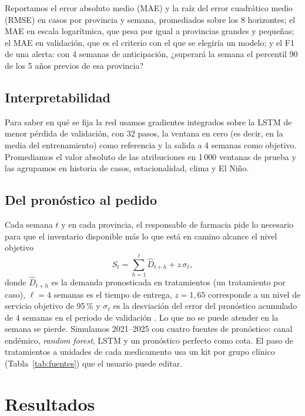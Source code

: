 \documentclass[conference,a4paper]{IEEEtran}
\begin{document}
Reportamos el error absoluto medio (MAE) y la raíz del error cuadrático medio (RMSE) en casos por provincia y semana, promediados sobre los 8 horizontes; el MAE en escala logarítmica, que pesa por igual a provincias grandes y pequeñas; el MAE en validación, que es el criterio con el que se elegiría un modelo; y el F1 de una alerta: con 4 semanas de anticipación, ¿superará la semana el percentil 90 de los 5 años previos de esa provincia?

\subsection{Interpretabilidad}
Para saber en qué se fija la red usamos gradientes integrados \cite{sundararajan2017ig} sobre la LSTM de menor pérdida de validación, con 32 pasos, la ventana en cero (es decir, en la media del entrenamiento) como referencia y la salida a 4 semanas como objetivo. Promediamos el valor absoluto de las atribuciones en 1\,000 ventanas de prueba y las agrupamos en historia de casos, estacionalidad, clima y El Niño.

\subsection{Del pronóstico al pedido}
Cada semana $t$ y en cada provincia, el responsable de farmacia pide lo necesario para que el inventario disponible más lo que está en camino alcance el nivel objetivo
\begin{equation}
S_t=\sum_{h=1}^{\ell}\hat{D}_{t+h}+z\,\sigma_\ell ,\label{eq:stock}
\end{equation}
donde $\hat{D}_{t+h}$ es la demanda pronosticada en tratamientos (un tratamiento por caso), $\ell=4$ semanas es el tiempo de entrega, $z=1{,}65$ corresponde a un nivel de servicio objetivo de 95\,\% y $\sigma_\ell$ es la desviación del error del pronóstico acumulado de 4 semanas en el periodo de validación \cite{silver2017inventory}. Lo que no se puede atender en la semana se pierde. Simulamos 2021--2025 con cuatro fuentes de pronóstico: canal endémico, \textit{random forest}, LSTM y un pronóstico perfecto como cota. El paso de tratamientos a unidades de cada medicamento usa un kit por grupo clínico (Tabla~\ref{tab:fuentes}) que el usuario puede editar.

\section{Resultados}
\end{document}
